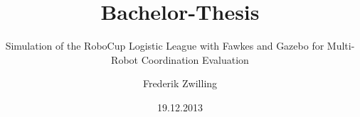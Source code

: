 \documentclass[]{beamer}
\title{Bachelor-Thesis}
\subtitle{Simulation of the RoboCup Logistic League with Fawkes and Gazebo for Multi-Robot Coordination Evaluation}
\author {Frederik Zwilling}
\institute{RWTH Aachen}
\date{19.12.2013}
\begin{document}
\frame{\titlepage}

\end{document}
